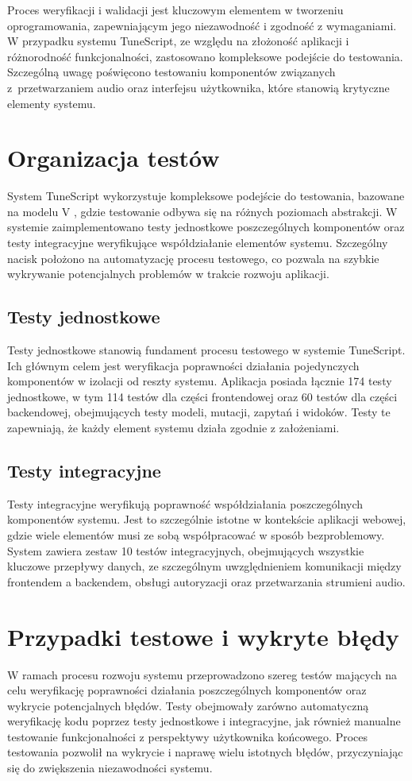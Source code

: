 \documentclass[a4paper,twoside,12pt]{book}
\begin{document}
Proces weryfikacji i walidacji jest kluczowym elementem w tworzeniu oprogramowania, zapewniającym jego niezawodność i zgodność z wymaganiami. W przypadku systemu TuneScript, ze względu na złożoność aplikacji i różnorodność funkcjonalności, zastosowano kompleksowe podejście do testowania. Szczególną uwagę poświęcono testowaniu komponentów związanych z~przetwarzaniem audio oraz interfejsu użytkownika, które stanowią krytyczne elementy systemu.

\section{Organizacja testów}
System TuneScript wykorzystuje kompleksowe podejście do testowania, bazowane na modelu V \cite{bib:v_model}, gdzie testowanie odbywa się na różnych poziomach abstrakcji. W systemie zaimplementowano testy jednostkowe poszczególnych komponentów oraz testy integracyjne weryfikujące współdziałanie elementów systemu. Szczególny nacisk położono na automatyzację procesu testowego, co pozwala na szybkie wykrywanie potencjalnych problemów w trakcie rozwoju aplikacji.

\subsection{Testy jednostkowe}
Testy jednostkowe stanowią fundament procesu testowego w systemie TuneScript. Ich głównym celem jest weryfikacja poprawności działania pojedynczych komponentów w izolacji od reszty systemu. Aplikacja posiada łącznie 174 testy jednostkowe, w tym 114 testów dla części frontendowej oraz 60 testów dla części backendowej, obejmujących testy modeli, mutacji, zapytań i widoków. Testy te zapewniają, że każdy element systemu działa zgodnie z założeniami.

\subsection{Testy integracyjne}
Testy integracyjne weryfikują poprawność współdziałania poszczególnych komponentów systemu. Jest to szczególnie istotne w kontekście aplikacji webowej, gdzie wiele elementów musi ze sobą współpracować w sposób bezproblemowy. System zawiera zestaw 10 testów integracyjnych, obejmujących wszystkie kluczowe przepływy danych, ze szczególnym uwzględnieniem komunikacji między frontendem a backendem, obsługi autoryzacji oraz przetwarzania strumieni audio.

\section{Przypadki testowe i wykryte błędy}
W ramach procesu rozwoju systemu przeprowadzono szereg testów mających na celu weryfikację poprawności działania poszczególnych komponentów oraz wykrycie potencjalnych błędów. Testy obejmowały zarówno automatyczną weryfikację kodu poprzez testy jednostkowe i integracyjne, jak również manualne testowanie funkcjonalności z perspektywy użytkownika końcowego. Proces testowania pozwolił na wykrycie i naprawę wielu istotnych błędów, przyczyniając się do zwiększenia niezawodności systemu.
\end{document}

